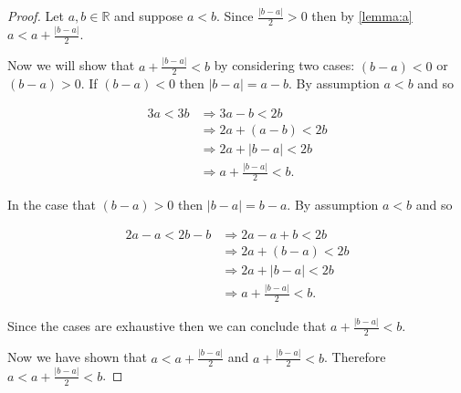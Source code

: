 \documentclass[12pt]{article}
\begin{document}
\begin{proof}
Let $a, b \in \mathbb{R}$ and suppose $a < b$. Since $\displaystyle \frac{|b - a|}{2} > 0$ then by \autoref{lemma:a} $\displaystyle a < a + \frac{|b - a|}{2}$. 

Now we will show that $\displaystyle a + \frac{|b - a|}{2} < b$ by considering two cases: $(b - a) < 0$ or $(b - a) > 0$. If $(b - a) < 0$ then $|b - a| = a - b$. By assumption $a < b$ and so

\begin{equation*}
  \begin{split}
  3a < 3b &\Rightarrow 3a - b < 2b \\
  &\Rightarrow 2a + (a - b) < 2b \\ 
	&\Rightarrow 2a + |b - a| < 2b \\
	&\Rightarrow a + \frac{|b - a|}{2} < b.
	\end{split}
\end{equation*}

In the case that $(b - a) > 0$ then $|b - a| = b - a$. By assumption $a < b$ and so 

\begin{equation*}
\begin{split}
2a - a < 2b - b &\Rightarrow 2a - a + b < 2b \\
&\Rightarrow 2a + (b - a) < 2b \\
&\Rightarrow 2a + |b - a| < 2b \\
&\Rightarrow a + \frac{|b - a|}{2} < b.
\end{split}
\end{equation*}


Since the cases are exhaustive then we can conclude that $\displaystyle a + \frac{|b - a|}{2} < b$.

Now we have shown that $\displaystyle a < a + \frac{|b - a|}{2}$ and $\displaystyle a + \frac{|b - a|}{2} < b$. Therefore $\displaystyle a < a + \frac{|b - a|}{2} < b$.
\end{proof}
\end{document}
